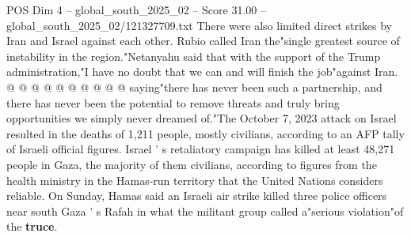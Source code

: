 \begin{textsample}{POS Dim 4 – global\_south\_2025\_02 – Score 31.00 – global\_south\_2025\_02/121327709.txt}
There were also limited direct strikes by Iran and Israel against each other.
Rubio called Iran the"single greatest source of instability in the region."Netanyahu said that with the support of the Trump administration,"I have no doubt that we can and will finish the job"against Iran. @ @ @ @ @ @ @ @ @ @ saying"there has never been such a partnership, and there has never been the potential to remove threats and truly bring opportunities we simply never dreamed of."The October 7, 2023 attack on Israel resulted in the deaths of 1,211 people, mostly civilians, according to an AFP tally of Israeli official figures.
Israel ' s retaliatory campaign has killed at least 48,271 people in Gaza, the majority of them civilians, according to figures from the health ministry in the Hamas-run territory that the United Nations considers reliable.
On Sunday, Hamas said an Israeli air strike killed three police officers near south Gaza ' s Rafah in what the militant group called a"serious violation"of the \textbf{truce}.

\end{textsample}
